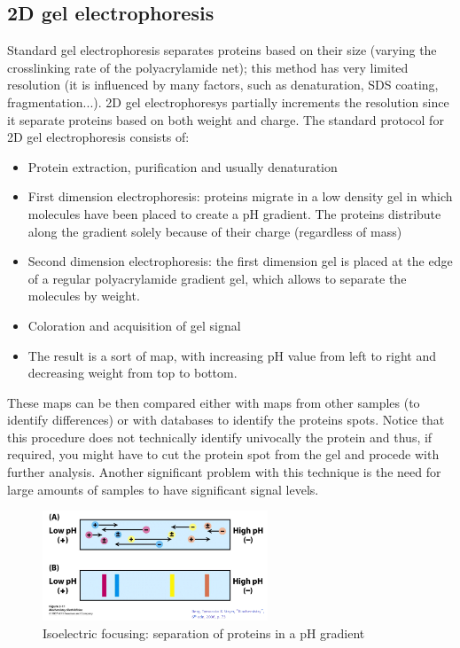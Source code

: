     \subsection{2D gel electrophoresis}
      Standard gel electrophoresis separates proteins based on their size (varying the crosslinking rate of the polyacrylamide net); this method has very limited resolution (it is influenced by many factors, such as denaturation, SDS coating, fragmentation...).
      2D gel electrophoresys partially increments the resolution since it separate proteins based on both weight and charge.
      The standard protocol for 2D gel electrophoresis consists of:
      \begin{itemize}
        \item Protein extraction, purification and usually denaturation
        \item First dimension electrophoresis: proteins migrate in a low density gel in which molecules have been placed to create a pH gradient. The proteins distribute along the gradient solely because of their charge (regardless of mass)
        \item Second dimension electrophoresis: the first dimension gel is placed at the edge of a regular polyacrylamide gradient gel, which allows to separate the molecules by weight. 
        \item Coloration and acquisition of gel signal
        \item The result is a sort of map, with increasing pH value from left to right and decreasing weight from top to bottom.
      \end{itemize}
      These maps can be then compared either with maps from other samples (to identify differences) or with databases to identify the proteins spots. Notice that this procedure does not technically identify univocally the protein and thus, if required, you might have to cut the protein spot from the gel and procede with further analysis. Another significant problem with this technique is the need for large amounts of samples to have significant signal levels.

      \begin{figure}[h]
      \caption{Isoelectric focusing: separation of proteins in a pH gradient}
      \centering
      \includegraphics[width=0.6\textwidth]{IsoelectricProteinSeparation}
      \end{figure}

